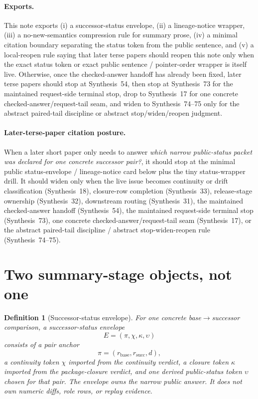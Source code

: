 \documentclass[11pt]{article}
\newtheorem{definition}{Definition}
\begin{document}
\paragraph{Exports.}
This note exports (i) a successor-status envelope, (ii) a lineage-notice wrapper, (iii) a no-new-semantics compression rule for summary prose, (iv) a minimal citation boundary separating the status token from the public sentence, and (v) a local-reopen rule saying that later terse papers should reopen this note only when the exact status token or exact public sentence / pointer-order wrapper is itself live. Otherwise, once the checked-answer handoff has already been fixed, later terse papers should stop at Synthesis~54, then stop at Synthesis~73 for the maintained request-side terminal stop, drop to Synthesis~17 for one concrete checked-answer/request-tail seam, and widen to Synthesis~74--75 only for the abstract paired-tail discipline or abstract stop/widen/reopen judgment.\cite{series:challengeanswerreviewmenus,series:pairedterminalcitationdiscipline,series:pairedterminalcutoverrules,series:workedexample}

\paragraph{Later-terse-paper citation posture.}
When a later short paper only needs to answer \emph{which narrow public-status packet was declared for one concrete successor pair?}, it should stop at the minimal public status-envelope / lineage-notice card below plus the tiny status-wrapper drill. It should widen only when the live issue becomes continuity or drift classification (Synthesis~18), closure-row completion (Synthesis~33), release-stage ownership (Synthesis~32), downstream routing (Synthesis~31), the maintained checked-answer handoff (Synthesis~54), the maintained request-side terminal stop (Synthesis~73), one concrete checked-answer/request-tail seam (Synthesis~17), or the abstract paired-tail discipline / abstract stop-widen-reopen rule (Synthesis~74--75).\cite{series:planstateequiv,series:releaseclosure,series:releasespine,series:downstreamnormalforms,series:challengeanswerreviewmenus,series:pairedterminalcitationdiscipline,series:pairedterminalcutoverrules,series:workedexample}

\section{Two summary-stage objects, not one}

\begin{definition}[Successor-status envelope]
For one concrete base$\to$successor comparison, a \emph{successor-status envelope}
\[
E=(\pi,\chi,\kappa,\upsilon)
\]
consists of a pair anchor
\[
\pi=(r_{\mathrm{base}},r_{\mathrm{succ}},d),
\]
a continuity token $\chi$ imported from the continuity verdict, a closure token $\kappa$ imported from the package-closure verdict, and one derived public-status token $\upsilon$ chosen for that pair.
The envelope owns the narrow public answer.
It does not own numeric diffs, role rows, or replay evidence.
\end{definition}
\end{document}
